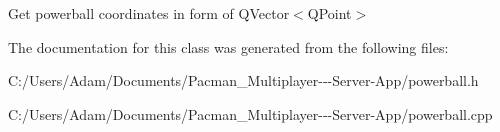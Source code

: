 Get powerball coordinates in form of Q\+Vector$<$\+Q\+Point$>$ 

The documentation for this class was generated from the following files\+:\begin{DoxyCompactItemize}
\item 
C\+:/\+Users/\+Adam/\+Documents/\+Pacman\+\_\+\+Multiplayer-\/-\/-\/\+Server-\/\+App/powerball.\+h\item 
C\+:/\+Users/\+Adam/\+Documents/\+Pacman\+\_\+\+Multiplayer-\/-\/-\/\+Server-\/\+App/powerball.\+cpp\end{DoxyCompactItemize}
